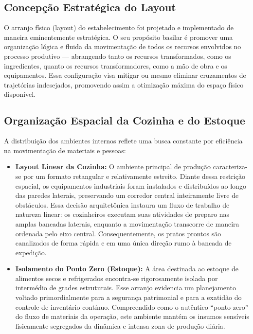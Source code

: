 \documentclass[12pt, a4paper]{article}
\begin{document}
\subsection{Concepção Estratégica do Layout}
O arranjo físico (layout) do estabelecimento foi projetado e implementado de maneira eminentemente estratégica. O seu propósito basilar é promover uma organização lógica e fluida da movimentação de todos os recursos envolvidos no processo produtivo — abrangendo tanto os recursos transformados, como os ingredientes, quanto os recursos transformadores, como a mão de obra e os equipamentos. Essa configuração visa mitigar ou mesmo eliminar cruzamentos de trajetórias indesejados, promovendo assim a otimização máxima do espaço físico disponível.

\subsection{Organização Espacial da Cozinha e do Estoque}
A distribuição dos ambientes internos reflete uma busca constante por eficiência na movimentação de materiais e pessoas:

\begin{itemize}
    \item \textbf{Layout Linear da Cozinha:} O ambiente principal de produção caracteriza-se por um formato retangular e relativamente estreito. Diante dessa restrição espacial, os equipamentos industriais foram instalados e distribuídos ao longo das paredes laterais, preservando um corredor central inteiramente livre de obstáculos. Essa decisão arquitetônica instaura um fluxo de trabalho de natureza linear: os cozinheiros executam suas atividades de preparo nas amplas bancadas laterais, enquanto a movimentação transcorre de maneira ordenada pelo eixo central. Consequentemente, os pratos prontos são canalizados de forma rápida e em uma única direção rumo à bancada de expedição.
    \item \textbf{Isolamento do Ponto Zero (Estoque):} A área destinada ao estoque de alimentos secos e refrigerados encontra-se rigorosamente isolada por intermédio de grades estruturais. Esse arranjo evidencia um planejamento voltado primordialmente para a segurança patrimonial e para a exatidão do controle de inventário contínuo. Compreendido como o autêntico ``ponto zero'' do fluxo de materiais da operação, este ambiente mantém os insumos sensíveis fisicamente segregados da dinâmica e intensa zona de produção diária.
\end{itemize}
\end{document}
